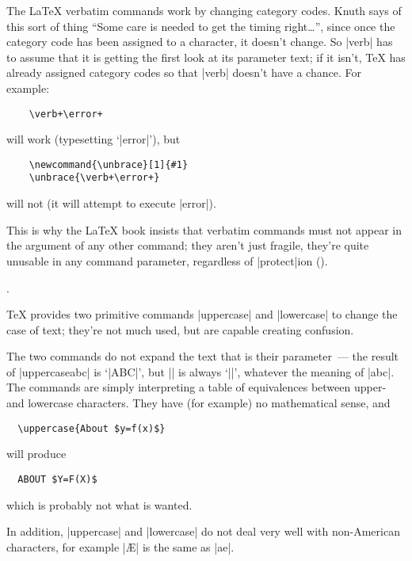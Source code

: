 \begin{changemargin}{-1cm}{-1cm}

The \LaTeX{} verbatim commands work by changing category codes.  Knuth
says of this sort of thing ``Some care is needed to get the timing
right\dots{}'', since once the category code has been assigned to a
character, it doesn't change.  So \cs|verb| has to assume that it is
getting the first look at its parameter text; if it isn't, \TeX{} has
already assigned category codes so that \cs|verb| doesn't have a
chance.  For example:
\begin{verbatim}
    \verb+\error+
\end{verbatim}
will work (typesetting `\cs|error|'), but
\begin{verbatim}
    \newcommand{\unbrace}[1]{#1}
    \unbrace{\verb+\error+}
\end{verbatim}
will not (it will attempt to execute \cs|error|).

This is why the \LaTeX{} book insists that verbatim
commands must not appear in the argument of any other command; they
aren't just fragile, they're quite unusable in any command parameter,
regardless of
\htmlignore
\cs|protect|ion ().
\endhtmlignore
\begin{htmlversion}
.
\end{htmlversion}


\TeX{} provides two primitive commands \cs|uppercase| and
\cs|lowercase| to change the case of text; they're not much used, but
are capable creating confusion.

The two commands do not expand the text that is their parameter~---
the result of \cs|uppercase{abc}| is `|ABC|', but |\uppercase{\abc}|
is always `|\abc|', whatever the meaning of \cs|abc|.  The commands
are simply interpreting a table of equivalences between upper- and
lowercase characters.
They have (for example) no mathematical sense, and
\begin{verbatim}
  \uppercase{About $y=f(x)$}
\end{verbatim}
will produce
\begin{verbatim}
  ABOUT $Y=F(X)$
\end{verbatim}
which is probably not what is wanted.

In addition, \cs|uppercase| and \cs|lowercase| do not deal very well
with non-American characters, for example |\uppercase{\ae}| is the
same as \cs|ae|.


\end{changemargin}
